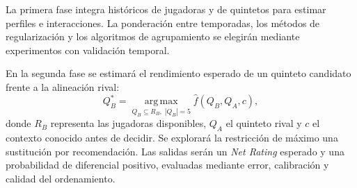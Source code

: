 La primera fase integra históricos de jugadoras y de quintetos para estimar perfiles e interacciones. La ponderación entre temporadas, los métodos de regularización y los algoritmos de agrupamiento se elegirán mediante experimentos con validación temporal.

En la segunda fase se estimará el rendimiento esperado de un quinteto candidato frente a la alineación rival:
\begin{equation}
 Q_B^*=\underset{Q_B\subseteq R_B,\;|Q_B|=5}{\operatorname{arg\,max}}\widehat f(Q_B,Q_A,c),
\end{equation}
donde $R_B$ representa las jugadoras disponibles, $Q_A$ el quinteto rival y $c$ el contexto conocido antes de decidir. Se explorará la restricción de máximo una sustitución por recomendación. Las salidas serán un \textit{Net Rating} esperado y una probabilidad de diferencial positivo, evaluadas mediante error, calibración y calidad del ordenamiento.